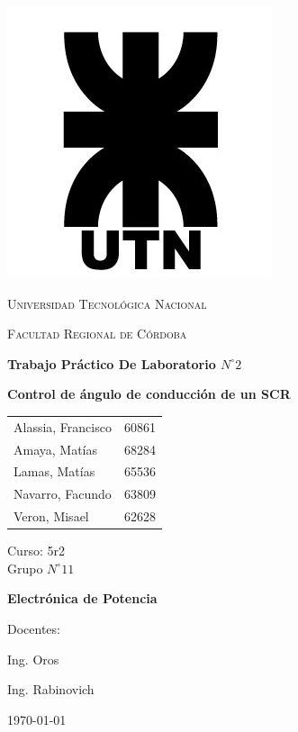 \documentclass{article}
\begin{document}
\begin{titlepage}
 \centering
	\includegraphics[scale=0.80]{imagenes/LOGO.jpg} \par
 	\vspace{1cm}
 	{\scshape\LARGE Universidad Tecnológica Nacional \par}
 	{\scshape\large Facultad Regional de Córdoba \par}
 	\vspace{1cm}
	{\bfseries \Large Trabajo Práctico De Laboratorio $N^{\circ} 2$\par}
	{\bfseries \Large Control de ángulo de conducción de un SCR \par}
 	\vspace{1.5cm}

	\begin{tabular}{ll}
		Alassia, Francisco	&	60861	\\
		Amaya, Matías		&	68284	\\
		Lamas, Matías 		&	65536 	\\
		Navarro, Facundo 	&	63809 	\\
		Veron, Misael	 	&	62628
	\end{tabular}
	
	\vspace{1cm}
	Curso: 5r2 \\
	Grupo $N^{\circ} 11$
 	\vfill
	{\bfseries \Large Electrónica de Potencia \par}

	\vspace{1.5cm}
	Docentes: \par
	Ing. Oros \par
	Ing. Rabinovich \par

 	\vfill
	{\large \today\par}
\end{titlepage}
\end{document}
